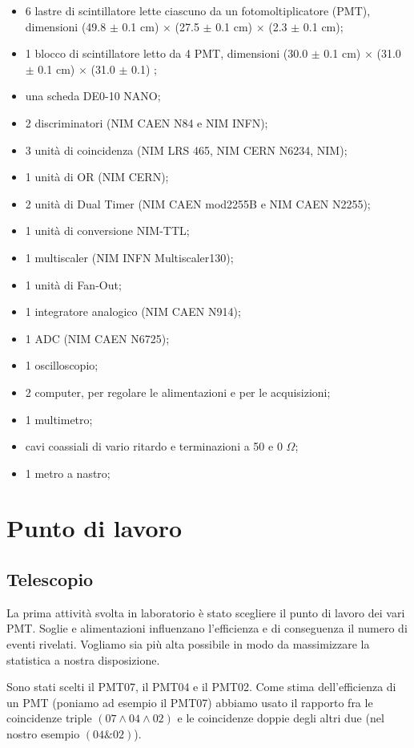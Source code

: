 \documentclass[10pt,a4paper]{article}
\begin{document}
\begin{itemize}
\item 6 lastre di scintillatore lette ciascuno da un fotomoltiplicatore (PMT), dimensioni (49.8 $\pm$ 0.1 cm) $\times$ (27.5 $\pm$ 0.1 cm) $\times$ (2.3 $\pm$ 0.1 cm);
\item 1 blocco di scintillatore letto da 4 PMT, dimensioni (30.0 $\pm$ 0.1 cm) $\times$ (31.0 $\pm$ 0.1 cm) $\times$ (31.0 $\pm$ 0.1) ;
\item una scheda DE0-10 NANO;
\item 2 discriminatori (NIM CAEN N84 e NIM INFN);
\item 3 unità di coincidenza (NIM LRS 465, NIM CERN N6234, NIM);
\item 1 unità di OR (NIM CERN);
\item 2 unità di Dual Timer (NIM CAEN mod2255B e NIM CAEN N2255);
\item 1 unità di conversione NIM-TTL;
\item 1 multiscaler (NIM INFN Multiscaler130);
\item 1 unità di Fan-Out;
\item 1 integratore analogico (NIM CAEN N914);
\item 1 ADC (NIM CAEN N6725);
\item 1 oscilloscopio;
\item 2 computer, per regolare le alimentazioni e per le acquisizioni;
\item 1 multimetro;
\item cavi coassiali di vario ritardo e terminazioni a 50 e 0 $\Omega$;
\item 1 metro a nastro;
\end{itemize}

\newpage

\section{Punto di lavoro}

\subsection{Telescopio}

La prima attività svolta in laboratorio è stato scegliere il punto di lavoro dei vari PMT. Soglie e alimentazioni influenzano l'efficienza e di conseguenza il numero di eventi rivelati. Vogliamo sia più alta possibile in modo da massimizzare la statistica a nostra disposizione. 

Sono stati scelti il PMT07, il PMT04 e il PMT02. Come stima dell'efficienza di un PMT (poniamo ad esempio il PMT07) abbiamo usato il rapporto fra le coincidenze triple $(07\land04\land02)$ e le coincidenze doppie degli altri due (nel nostro esempio $(04\&02)$). 
\end{document}
